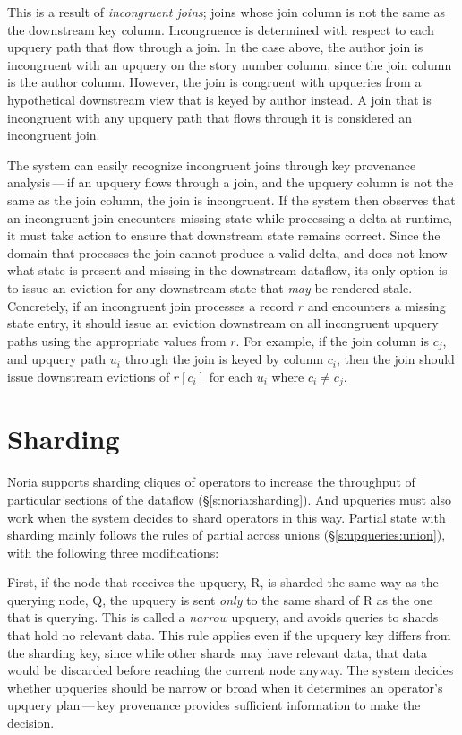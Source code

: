 This is a result of \textit{incongruent joins}; joins whose join column is not
the same as the downstream key column. Incongruence is determined with respect
to each upquery path that flow through a join. In the case above, the author
join is incongruent with an upquery on the story number column, since the join
column is the author column. However, the join is congruent with upqueries from
a hypothetical downstream view that is keyed by author instead. A join that is
incongruent with any upquery path that flows through it is considered an
incongruent join.

The system can easily recognize incongruent joins through key provenance
analysis\,---\,if an upquery flows through a join, and the upquery column is not
the same as the join column, the join is incongruent. If the system then
observes that an incongruent join encounters missing state while processing a
delta at runtime, it must take action to ensure that downstream state remains
correct. Since the domain that processes the join cannot produce a valid delta,
and does not know what state is present and missing in the downstream dataflow,
its only option is to issue an eviction for any downstream state that \emph{may}
be rendered stale. Concretely, if an incongruent join processes a record $r$ and
encounters a missing state entry, it should issue an eviction downstream on all
incongruent upquery paths using the appropriate values from $r$. For example, if
the join column is $c_j$, and upquery path $u_i$ through the join is keyed by
column $c_i$, then the join should issue downstream evictions of $r[c_i]$ for
each $u_i$ where $c_i \neq c_j$.

\section{Sharding}

Noria supports sharding cliques of operators to increase the throughput of
particular sections of the dataflow (\S\ref{s:noria:sharding}). And upqueries
must also work when the system decides to shard operators in this way. Partial
state with sharding mainly follows the rules of partial across unions
(\S\ref{s:upqueries:union}), with the following three modifications:

First, if the node that receives the upquery, R, is sharded the same way as the
querying node, Q, the upquery is sent \emph{only} to the same shard of R as the
one that is querying. This is called a \textit{narrow} upquery, and avoids
queries to shards that hold no relevant data. This rule applies even if the
upquery key differs from the sharding key, since while other shards may have
relevant data, that data would be discarded before reaching the current node
anyway. The system decides whether upqueries should be narrow or broad when it
determines an operator's upquery plan\,---\,key provenance provides sufficient
information to make the decision.

